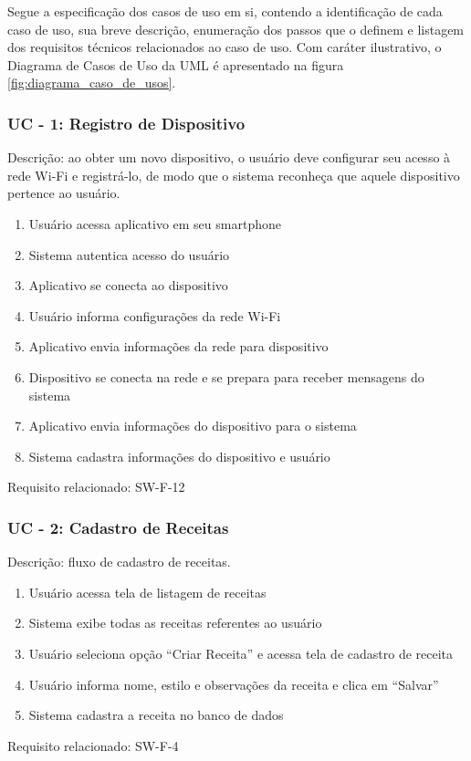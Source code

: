 Segue a especificação dos casos de uso em si, contendo a identificação de cada caso de uso, sua breve descrição, enumeração dos passos que o definem e 
listagem dos requisitos técnicos relacionados ao caso de uso. Com caráter ilustrativo, o Diagrama de Casos de Uso da UML é apresentado na figura \ref{fig:diagrama_caso_de_usos}.

\subsubsection*{UC - 1: Registro de Dispositivo} 

Descrição: ao obter um novo dispositivo, o usuário deve configurar seu acesso à rede Wi-Fi e registrá-lo, de modo que o sistema reconheça que aquele 
dispositivo pertence ao usuário.
\begin{enumerate}
    \item Usuário acessa aplicativo em seu smartphone
    \item Sistema autentica acesso do usuário
    \item Aplicativo se conecta ao dispositivo 
    \item Usuário informa configurações da rede Wi-Fi
    \item Aplicativo envia informações da rede para dispositivo
    \item Dispositivo se conecta na rede e se prepara para receber mensagens do sistema
    \item Aplicativo envia informações do dispositivo para o sistema
    \item Sistema cadastra informações do dispositivo e usuário
\end{enumerate}
Requisito relacionado: SW-F-12

\subsubsection*{UC - 2: Cadastro de Receitas}
Descrição: fluxo de cadastro de receitas.
\begin{enumerate}
    \item Usuário acessa tela de listagem de receitas
    \item Sistema exibe todas as receitas referentes ao usuário
    \item Usuário seleciona opção “Criar Receita” e acessa tela de cadastro de receita
    \item Usuário informa nome, estilo e observações da receita e clica em “Salvar”
    \item Sistema cadastra a receita no banco de dados
\end{enumerate}
Requisito relacionado: SW-F-4

